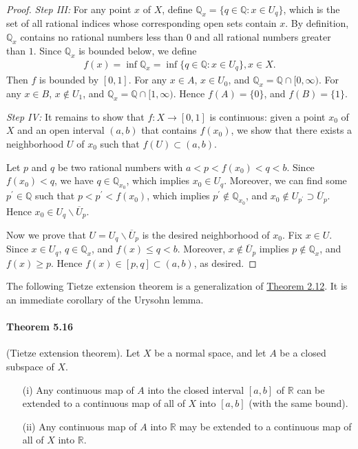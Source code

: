 \documentclass{article}
\numberwithin{equation}{section}
\theoremstyle{plain}
\theoremstyle{definition}
\begin{document}
\begin{proof}
\textit{Step III:} For any point $x$ of $X$, define $\mathbb{Q}_x=\{q\in\mathbb{Q}:x\in U_q\}$, which is the set of all rational indices whose corresponding open sets contain $x$. By definition, $\mathbb{Q}_x$ contains no rational numbers less than $0$ and all rational numbers greater than $1$. Since $\mathbb{Q}_x$ is bounded below, we define
\begin{align*}
	f(x)=\inf\mathbb{Q}_x = \inf\{q\in\mathbb{Q}:x\in U_q\}, x\in X.
\end{align*}
Then $f$ is bounded by $[0,1]$. For any $x\in A$, $x\in U_0$, and $\mathbb{Q}_x=\mathbb{Q}\cap[0,\infty)$. For any $x\in B$, $x\notin U_1$, and $\mathbb{Q}_x=\mathbb{Q}\cap[1,\infty)$. Hence $f(A)=\{0\}$, and $f(B)=\{1\}$.
\vspace{0.12cm}

\textit{Step IV:} It remains to show that $f:X\to[0,1]$ is continuous: 
given a point $x_0$ of $X$ and an open interval $(a,b)$ that contains $f(x_0)$, we show that there exists a neighborhood $U$ of $x_0$ such that $f(U)\subset (a,b)$. 

Let $p$ and $q$ be two rational numbers with $a<p<f(x_0)<q<b$. Since $f(x_0)<q$, we have $q\in\mathbb{Q}_{x_0}$, which implies $x_0\in U_q$. Moreover, we can find some $p^\prime\in\mathbb{Q}$ such that $p<p^\prime<f(x_0)$, which implies $p^\prime\notin\mathbb{Q}_{x_0}$, and $x_0\notin U_{p^\prime}\supset \overline{U}_{p}$. Hence $x_0\in U_q\backslash\overline{U}_p$.

Now we prove that $U=U_q\backslash\overline{U}_p$ is the desired neighborhood of $x_0$. Fix $x\in U$. Since $x\in U_q$, $q\in\mathbb{Q}_x$, and $f(x)\leq q < b$. Moreover, $x\notin\overline{U}_p$ implies $p\notin\mathbb{Q}_x$, and $f(x)\geq p$. Hence $f(x)\in[p,q]\subset(a,b)$, as desired.
\end{proof}

The following Tietze extension theorem is a generalization of \hyperref[thm:2.12]{Theorem 2.12}. It is an immediate corollary of the Urysohn lemma.

\paragraph{Theorem 5.16\label{thm:5.16}} (Tietze extension theorem). Let $X$ be a normal space, and let $A$ be a closed subspace of $X$.
\begin{itemize}
	\item[(i)] Any continuous map of $A$ into the closed interval $[a,b]$ of $\mathbb{R}$ can be extended to a continuous map of all of $X$ into $[a,b]$ (with the same bound).
	\item[(ii)] Any continuous map of $A$ into $\mathbb{R}$ may be extended to a continuous map of all	of $X$ into $\mathbb{R}$.
\end{itemize}
\end{document}
